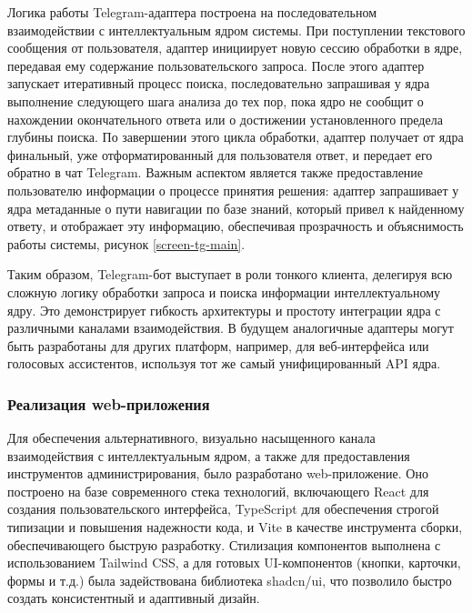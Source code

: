 
Логика работы Telegram-адаптера построена на последовательном взаимодействии с интеллектуальным ядром системы. При поступлении текстового сообщения от пользователя, адаптер инициирует новую сессию обработки в ядре, передавая ему содержание пользовательского запроса. После этого адаптер запускает итеративный процесс поиска, последовательно запрашивая у ядра выполнение следующего шага анализа до тех пор, пока ядро не сообщит о нахождении окончательного ответа или о достижении установленного предела глубины поиска. По завершении этого цикла обработки, адаптер получает от ядра финальный, уже отформатированный для пользователя ответ, и передает его обратно в чат Telegram. Важным аспектом является также предоставление пользователю информации о процессе принятия решения: адаптер запрашивает у ядра метаданные о пути навигации по базе знаний, который привел к найденному ответу, и отображает эту информацию, обеспечивая прозрачность и объяснимость работы системы, рисунок \ref{screen-tg-main}.

Таким образом, Telegram-бот выступает в роли тонкого клиента, делегируя всю сложную логику обработки запроса и поиска информации интеллектуальному ядру. Это демонстрирует гибкость архитектуры и простоту интеграции ядра с различными каналами взаимодействия. В будущем аналогичные адаптеры могут быть разработаны для других платформ, например, для веб-интерфейса или голосовых ассистентов, используя тот же самый унифицированный API ядра.

\subsubsection{Реализация web-приложения}

Для обеспечения альтернативного, визуально насыщенного канала взаимодействия с интеллектуальным ядром, а также для предоставления инструментов администрирования, было разработано web-приложение. Оно построено на базе современного стека технологий, включающего React для создания пользовательского интерфейса, TypeScript для обеспечения строгой типизации и повышения надежности кода, и Vite в качестве инструмента сборки, обеспечивающего быструю разработку. Стилизация компонентов выполнена с использованием Tailwind CSS, а для готовых UI-компонентов (кнопки, карточки, формы и т.д.) была задействована библиотека shadcn/ui, что позволило быстро создать консистентный и адаптивный дизайн.

